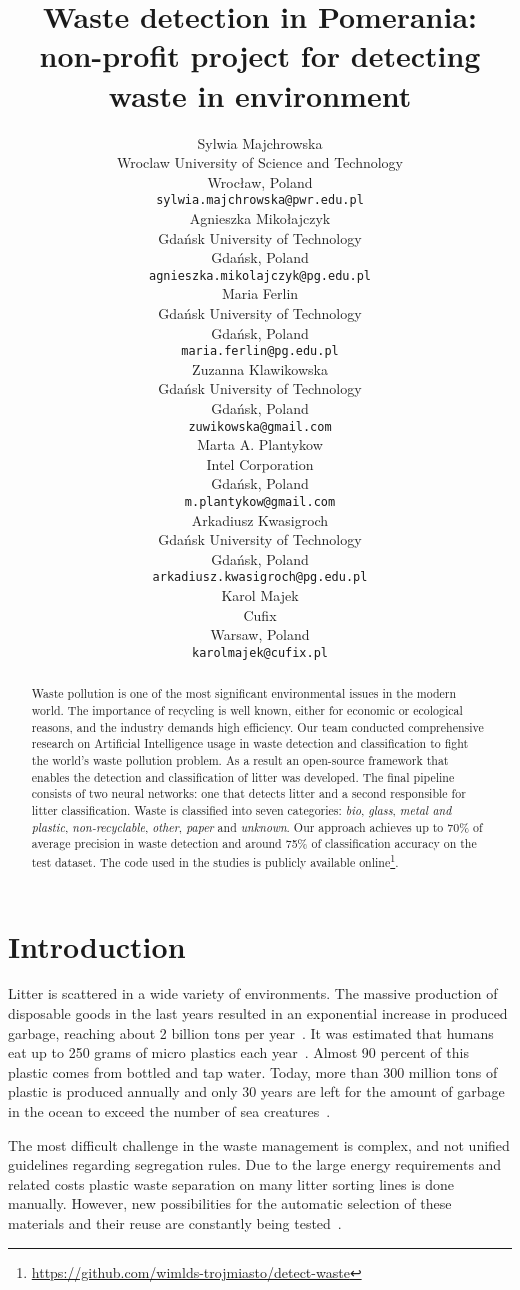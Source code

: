 \documentclass{article}
\title{Waste detection in Pomerania: non-profit project for detecting waste in environment}
\author{
  Sylwia Majchrowska \\
  Wroclaw University of Science and Technology\\
  Wrocław, Poland \\
  \texttt{sylwia.majchrowska@pwr.edu.pl} \\
\And
 Agnieszka Mikołajczyk \\
  Gdańsk University of Technology\\
  Gdańsk, Poland \\
  \texttt{agnieszka.mikolajczyk@pg.edu.pl} \\
  \And
 Maria Ferlin \\
  Gdańsk University of Technology\\
  Gdańsk, Poland \\
  \texttt{maria.ferlin@pg.edu.pl} \\
  \And
 Zuzanna Klawikowska \\
  Gdańsk University of Technology\\
  Gdańsk, Poland \\
  \texttt{zuwikowska@gmail.com} \\
  \And
 Marta A. Plantykow \\
  Intel Corporation \\
  Gdańsk, Poland \\
  \texttt{m.plantykow@gmail.com} \\
  \And
 Arkadiusz Kwasigroch \\
  Gdańsk University of Technology\\
  Gdańsk, Poland \\
  \texttt{arkadiusz.kwasigroch@pg.edu.pl} \\
  \And
 Karol Majek \\
  Cufix\\
  Warsaw, Poland \\
  \texttt{karolmajek@cufix.pl}
}
\begin{document}
\maketitle

\begin{abstract}
Waste pollution is one of the most significant environmental issues in the modern world. The importance of recycling is well known, either for economic or ecological reasons, and the industry demands high efficiency. Our team conducted comprehensive research on Artificial Intelligence usage in waste detection and classification to fight the world's waste pollution problem. As a result an open-source framework that enables the detection and classification of litter was developed. The final pipeline consists of two neural networks: one that detects litter and a second responsible for litter classification. Waste is classified into seven categories: \textit{bio}, \textit{glass}, \textit{metal and plastic}, \textit{non-recyclable}, \textit{other}, \textit{paper} and \textit{unknown}. Our approach achieves up to 70\% of average precision in waste detection and around 75\% of classification accuracy on the test dataset. The code used in the studies is publicly available online\footnote{\url{https://github.com/wimlds-trojmiasto/detect-waste}}.
\end{abstract}


\section{Introduction}
\label{sec:intro}
Litter is scattered in a wide variety of environments. The massive production of disposable goods in the last years resulted in an exponential increase in produced garbage, reaching about 2 billion tons per year~\cite{WB16}. It was estimated that humans eat up to 250 grams of micro plastics each year~\cite{NC19}. Almost 90 percent of this plastic comes from bottled and tap water. Today, more than 300 million tons of plastic is produced annually and only 30 years are left for the amount of garbage in the ocean to exceed the number of sea creatures~\cite{WE16}.

The most difficult challenge in the waste management is complex, and not unified guidelines regarding segregation rules. Due to the large energy requirements and related costs plastic waste separation on many litter sorting lines is done manually. However, new possibilities for the automatic selection of these materials and their reuse are constantly being tested~\cite{plastic_sorting}.
\end{document}
